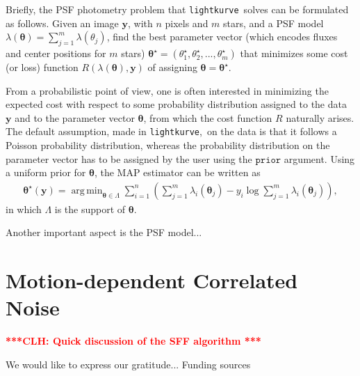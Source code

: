 \documentclass[twocolumn]{aastex62}
\newcommand{\lightkurve}{\texttt{lightkurve}}
\newcommand{\clh}[1]{\textcolor{red}{ \textbf{***CLH: #1 ***}}}
\DeclareMathOperator*{\argmin}{arg\,min}
\begin{document}
Briefly, the PSF photometry problem that \lightkurve~solves can be formulated as
follows. Given an image $\bm{y}$, with $n$ pixels and $m$ stars, and a PSF model
$\lambda(\bm{\theta}) = \sum_{j=1}^{m} \lambda({\theta}_j)$,
find the best parameter vector (which encodes fluxes and center positions for $m$
stars) $\bm{\theta}^{\star} = (\theta_1^{\star}, \theta_2^{\star}, ..., \theta_m^{\star})$
that minimizes some cost (or loss) function $R(\lambda(\bm{\theta}), \bm{y})$
of assigning $\bm{\theta} = \bm{\theta}^{\star}$.

From a probabilistic point of view, one is often interested in minimizing the
expected cost with respect to some probability distribution assigned to the data
$\bm{y}$ and to the parameter vector $\bm{\theta}$, from which the cost function
$R$ naturally arises. The default assumption, made in \lightkurve,~on the data is
that it follows a Poisson probability distribution, whereas the probability
distribution on the parameter vector has to be assigned by the user using the $\texttt{prior}$
argument. Using a uniform prior for $\bm{\theta}$, the MAP estimator can be written
as
\begin{align}
    \bm{\theta}^{\star}(\bm{y}) = \argmin_{\bm{\theta} \in \Lambda} \sum_{i=1}^{n}
    \left(\sum_{j=1}^{m}\lambda_i(\bm{\theta}_j) - y_i\log\sum_{j=1}^{m}\lambda_i(\bm{\theta}_j)\right),
\end{align}
in which $\Lambda$ is the support of $\bm{\theta}$.

Another important aspect is the PSF model...

\section{Motion-dependent Correlated Noise}
\label{appendix:motion}

\clh{Quick discussion of the SFF algorithm}
\acknowledgments

We would like to express our gratitude...
Funding sources

\vspace{5mm}





\end{document}
